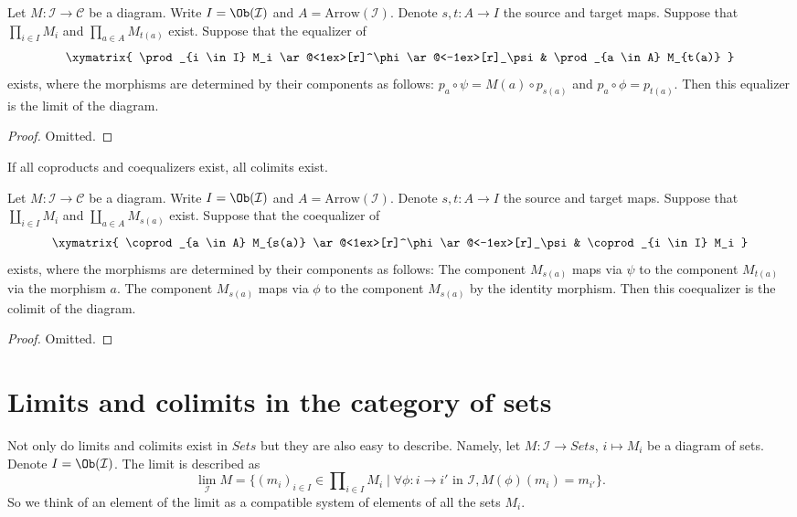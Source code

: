 \begin{lemma}
\label{lemma-limits-products-equalizers}
Let $M : \mathcal{I} \to \mathcal{C}$ be a diagram.
Write $I = \Ob(\mathcal{I})$ and $A = \text{Arrow}(\mathcal{I})$.
Denote $s, t : A \to I$ the source and target maps.
Suppose that $\prod_{i \in I} M_i$ and $\prod_{a \in A} M_{t(a)}$
exist. Suppose that the equalizer of
$$
\xymatrix{
\prod_{i \in I} M_i
\ar@<1ex>[r]^\phi \ar@<-1ex>[r]_\psi
&
\prod_{a \in A} M_{t(a)}
}
$$
exists, where the morphisms are determined by their components
as follows: $p_a \circ \psi = M(a) \circ p_{s(a)}$
and $p_a \circ \phi = p_{t(a)}$. Then this equalizer is the
limit of the diagram.
\end{lemma}

\begin{proof}
Omitted.
\end{proof}


\begin{lemma}
\label{lemma-colimits-coproducts-coequalizers}
\begin{slogan}
If all coproducts and coequalizers exist, all colimits exist.
\end{slogan}
Let $M : \mathcal{I} \to \mathcal{C}$ be a diagram.
Write $I = \Ob(\mathcal{I})$ and $A = \text{Arrow}(\mathcal{I})$.
Denote $s, t : A \to I$ the source and target maps.
Suppose that $\coprod_{i \in I} M_i$ and $\coprod_{a \in A} M_{s(a)}$
exist. Suppose that the coequalizer of
$$
\xymatrix{
\coprod_{a \in A} M_{s(a)}
\ar@<1ex>[r]^\phi \ar@<-1ex>[r]_\psi
&
\coprod_{i \in I} M_i
}
$$
exists, where the morphisms are determined by their components
as follows: The component $M_{s(a)}$ maps via $\psi$
to the component $M_{t(a)}$ via the morphism $a$.
The component $M_{s(a)}$ maps via $\phi$ to the component
$M_{s(a)}$ by the identity morphism. Then this coequalizer is the
colimit of the diagram.
\end{lemma}

\begin{proof}
Omitted.
\end{proof}







\section{Limits and colimits in the category of sets}
\label{section-limit-sets}

\noindent
Not only do limits and colimits exist in $\textit{Sets}$
but they are also easy to describe. Namely, let $M : \mathcal{I}
\to \textit{Sets}$, $i \mapsto M_i$ be a diagram of sets.
Denote $I = \Ob(\mathcal{I})$.
The limit is described as
$$
\lim_\mathcal{I} M
=
\{
(m_i)_{i\in I} \in \prod\nolimits_{i\in I} M_i
\mid
\forall \phi : i \to i' \text{ in }\mathcal{I},
M(\phi)(m_i) = m_{i'}
\}.
$$
So we think of an element of the limit as a compatible system of elements
of all the sets $M_i$.

